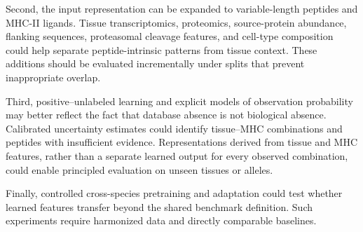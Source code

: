 Second, the input representation can be expanded to variable-length peptides and MHC-II ligands. Tissue transcriptomics, proteomics, source-protein abundance, flanking sequences, proteasomal cleavage features, and cell-type composition could help separate peptide-intrinsic patterns from tissue context. These additions should be evaluated incrementally under splits that prevent inappropriate overlap.

Third, positive--unlabeled learning and explicit models of observation probability may better reflect the fact that database absence is not biological absence. Calibrated uncertainty estimates could identify tissue--MHC combinations and peptides with insufficient evidence. Representations derived from tissue and MHC features, rather than a separate learned output for every observed combination, could enable principled evaluation on unseen tissues or alleles.

Finally, controlled cross-species pretraining and adaptation could test whether learned features transfer beyond the shared benchmark definition. Such experiments require harmonized data and directly comparable baselines.
